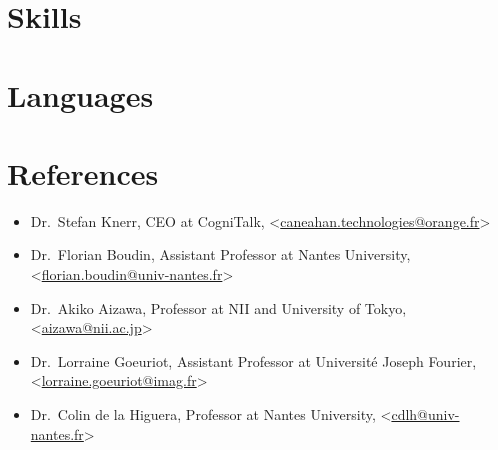 \documentclass[11pt,a4paper,sans]{moderncv}        %
\begin{document}
\section{Skills}


\section{Languages}

\section{References}
\begin{itemize}
\item Dr.~Stefan Knerr, CEO at CogniTalk,
  <\href{mailto:caneahan.technologies@orange.fr}{caneahan.technologies@orange.fr}>
\item Dr.~Florian Boudin, Assistant Professor at Nantes University,
  <\href{mailto:florian.boudin@univ-nantes.fr}{florian.boudin@univ-nantes.fr}>
\item Dr.~Akiko Aizawa, Professor at NII and University of Tokyo,
  <\href{mailto:aizawa@nii.ac.jp}{aizawa@nii.ac.jp}>
\item Dr.~Lorraine Goeuriot, Assistant Professor at Université Joseph
  Fourier,
  <\href{mailto:lorraine.goeuriot@imag.fr}{lorraine.goeuriot@imag.fr}>
\item Dr.~Colin de la Higuera, Professor at Nantes University,
  <\href{mailto:cdlh@univ-nantes.fr}{cdlh@univ-nantes.fr}>
\end{itemize}
\end{document}
